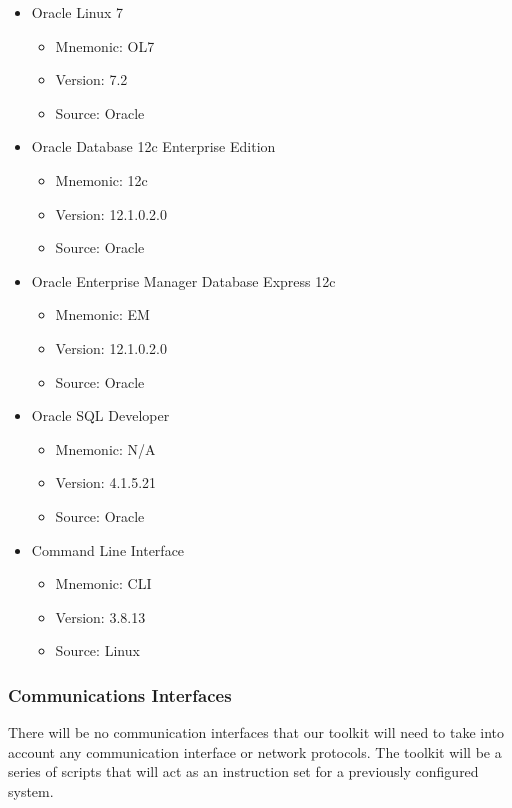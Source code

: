 \documentclass[draftclsnofoot, onecolumn, compsoc, 10pt]{IEEEtran}
\begin{document}
\begin{itemize}
	\item Oracle Linux 7
	\begin{itemize}
		\item Mnemonic: OL7
		\item Version: 7.2
        \item Source: Oracle
	\end{itemize}
	\item Oracle Database 12c Enterprise Edition
	\begin{itemize}
		\item Mnemonic: 12c
        \item Version: 12.1.0.2.0
        \item Source: Oracle
	\end{itemize}
    \item Oracle Enterprise Manager Database Express 12c
	\begin{itemize}
		\item Mnemonic: EM
        \item Version: 12.1.0.2.0
        \item Source: Oracle
	\end{itemize}
   	\item Oracle SQL Developer
	\begin{itemize}
		\item Mnemonic: N/A
        \item Version: 4.1.5.21
        \item Source: Oracle
	\end{itemize}
    \item Command Line Interface
	\begin{itemize}
		\item Mnemonic: CLI
        \item Version: 3.8.13
        \item Source: Linux
	\end{itemize}
\end{itemize}


\subsubsection{Communications Interfaces}
There will be no communication interfaces that our toolkit will need to take into account any communication interface or network protocols.
The toolkit will be a series of scripts that will act as an instruction set for a previously configured system.
\end{document}
